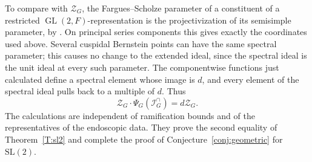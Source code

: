 \documentclass[11pt,a4paper]{amsart}
\newcommand{\mcZ}{\mathcal Z}
\theoremstyle{definition}
\theoremstyle{remark}
\DeclareMathOperator{\GL}{GL}
\newcommand{\Icap}{\mathcal I^{\cap}}
\begin{document}
To compare with $\mcZ_G$, the Fargues--Scholze parameter of a
constituent of a restricted $\GL(2,F)$-representation is the
projectivization of its semisimple parameter, by
\cite[Theorems IX.6.1 and IX.7.4]{FS}. On principal series
components this gives exactly the coordinates used above.
Several cuspidal Bernstein points can have the same spectral
parameter; this causes no change to the extended ideal, since the
spectral ideal is the unit ideal at every such parameter.
The componentwise functions just calculated define a spectral
element whose image is $d$, and every element of the spectral
ideal pulls back to a multiple of $d$. Thus
$$
 \mcZ_G\cdot\Psi_G(\Icap_G)=d\mcZ_G.
$$
The calculations are independent of ramification bounds and of
the representatives of the endoscopic data. They prove the
second equality of Theorem~\ref{T:sl2} and complete the proof of
Conjecture~\ref{conj:geometric} for $\mathrm{SL}(2)$.
\end{document}
